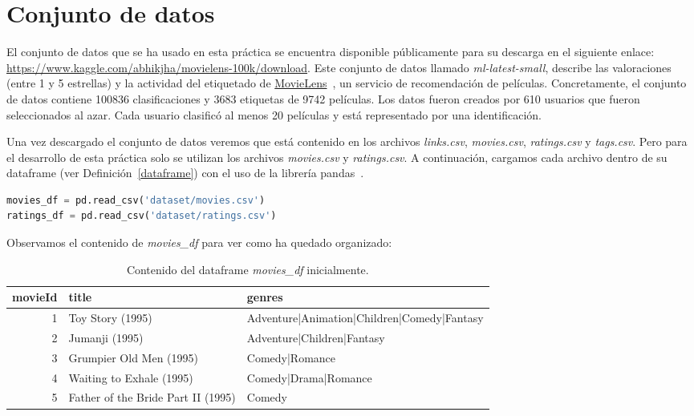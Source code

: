 \documentclass{uimppracticas}
\begin{document}
\newpage

\section{Conjunto de datos}\label{conjunto_datos}

El conjunto de datos que se ha usado en esta práctica se encuentra disponible públicamente para su descarga en el siguiente enlace: \url{https://www.kaggle.com/abhikjha/movielens-100k/download}. Este conjunto de datos llamado \textit{ml-latest-small}, describe las valoraciones (entre 1 y 5 estrellas) y la actividad del etiquetado de \href{http://movielens.org}{MovieLens}~\cite{MovieLens}, un servicio de recomendación de películas. Concretamente, el conjunto de datos contiene 100836 clasificaciones y 3683 etiquetas de 9742 películas. Los datos fueron creados por 610 usuarios que fueron seleccionados al azar. Cada usuario clasificó al menos 20 películas y está representado por una identificación.

Una vez descargado el conjunto de datos veremos que está contenido en los archivos \textit{links.csv}, \textit{movies.csv}, \textit{ratings.csv} y \textit{tags.csv}. Pero para el desarrollo de esta práctica solo se utilizan los archivos \textit{movies.csv} y \textit{ratings.csv}. A continuación, cargamos cada archivo dentro de su dataframe (ver Definición~\ref{dataframe}) con el uso de la librería pandas~\cite{pandas}.

\begin{lstlisting}[language=python]
movies_df = pd.read_csv('dataset/movies.csv')
ratings_df = pd.read_csv('dataset/ratings.csv')
\end{lstlisting}

Observamos el contenido de \textit{movies\_df} para ver como ha quedado organizado:

\begin{table}[h]
	\centering
	\begin{tabular}{rll}
		\toprule
		movieId &                               title &                                       genres \\
		\midrule
		1 &                    Toy Story (1995) &  Adventure|Animation|Children|Comedy|Fantasy \\
		2 &                      Jumanji (1995) &                   Adventure|Children|Fantasy \\
		3 &             Grumpier Old Men (1995) &                               Comedy|Romance \\
		4 &            Waiting to Exhale (1995) &                         Comedy|Drama|Romance \\
		5 &  Father of the Bride Part II (1995) &                                       Comedy \\
		\bottomrule
	\end{tabular}
	\caption{Contenido del dataframe \textit{movies\_df} inicialmente.}
	\label{movies_df}
\end{table}
\end{document}
